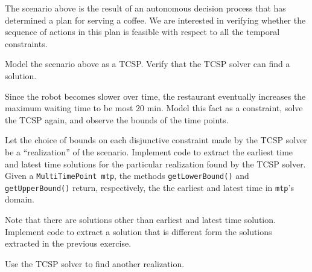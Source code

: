 \documentclass[a4paper]{article}
\begin{document}
\noindent The scenario above is the result of an autonomous decision process that has determined a plan for serving a coffee. We are interested in verifying whether the sequence of actions in this plan is feasible with respect to all the temporal constraints.

{\ex{}\label{ex:ex3}  
Model the scenario above as a TCSP. Verify that the TCSP solver can find a solution.
\vspace{0.1cm}}

{\ex{}\label{ex:ex4}
Since the robot becomes slower over time, the restaurant eventually increases the maximum waiting time to be most 20 min. Model this fact as a constraint, solve the TCSP again, and observe the bounds of the time points.
\vspace{0.1cm}}

{\ex{}\label{ex:ex5}
Let the choice of bounds on each disjunctive constraint made by the TCSP solver be a ``realization'' of the scenario.  Implement code to extract the earliest time and latest time solutions for the particular realization found by the TCSP solver. Given a {\tt MultiTimePoint mtp}, the methods {\tt getLowerBound()} and {\tt getUpperBound()} return, respectively, the the earliest and latest time in {\tt mtp}'s domain.
\vspace{0.1cm}}

{\ex{}\label{ex:ex6}
Note that there are solutions other than earliest and latest time solution. Implement code to extract a solution that is different form the solutions extracted in the previous exercise.
\vspace{0.1cm}}

{\ex{}\label{ex:ex7}
 Use the TCSP solver to find another realization.
\vspace{0.1cm}}


\end{document}
